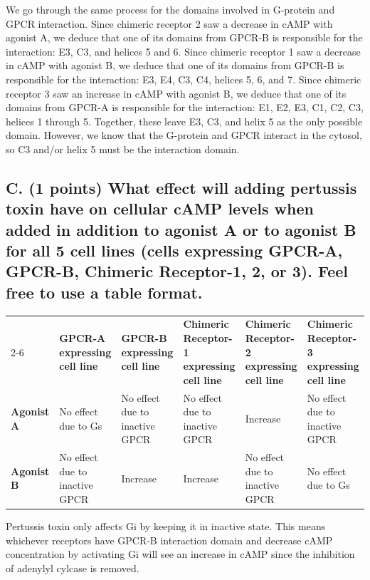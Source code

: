 \documentclass{article}
\begin{document}
We go through the same process for the domains involved in G-protein and GPCR interaction.
Since chimeric receptor 2 saw a decrease in cAMP with agonist A,
we deduce that one of its domains from GPCR-B is responsible for the interaction:
E3, C3, and helices 5 and 6.
Since chimeric receptor 1 saw a decrease in cAMP with agonist B,
we deduce that one of its domains from GPCR-B is responsible for the interaction:
E3, E4, C3, C4, helices 5, 6, and 7.
Since chimeric receptor 3 saw an increase in cAMP with agonist B,
we deduce that one of its domains from GPCR-A is responsible for the interaction:
E1, E2, E3, C1, C2, C3, helices 1 through 5.
Together, these leave E3, C3, and helix 5 as the only possible domain.
However, we know that the G-protein and GPCR interact in the cytosol,
so C3 and/or helix 5 must be the interaction domain.

\subsection*{
    C. (1 points)
    What effect will adding pertussis toxin have on cellular cAMP levels when added in addition to agonist A or to agonist B for all 5 cell lines
    (cells expressing GPCR-A, GPCR-B, Chimeric Receptor-1, 2, or 3).
    Feel free to use a table format.
}

\begin{table}[h]
    \centering
    \begin{tabularx}{\linewidth}{|l|*{5}{>{\centering\arraybackslash}X|}}
        \hline
        & \multicolumn{5}{c|}{\textbf{cAMP}} \\
        \cline{2-6}
        & \textbf{GPCR-A expressing cell line}
        & \textbf{GPCR-B expressing cell line}
        & \textbf{Chimeric Receptor-1 expressing cell line}
        & \textbf{Chimeric Receptor-2 expressing cell line}
        & \textbf{Chimeric Receptor-3 expressing cell line} \\
        \hline
        \textbf{Agonist A} & No effect due to Gs & No effect due to inactive GPCR & No effect due to inactive GPCR & Increase & No effect due to inactive GPCR \\
        \hline
        \textbf{Agonist B} & No effect due to inactive GPCR & Increase & Increase & No effect due to inactive GPCR & No effect due to Gs \\
        \hline
    \end{tabularx}
\end{table}


Pertussis toxin only affects Gi by keeping it in inactive state.
This means whichever receptors have GPCR-B interaction domain
and decrease cAMP concentration by activating Gi will see an increase in cAMP
since the inhibition of adenylyl cylcase is removed.
\end{document}
